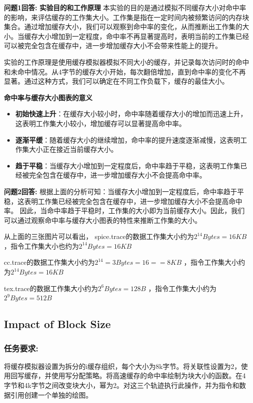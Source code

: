 \documentclass[12pt,hyperref,a4paper,UTF8]{ctexart}
\begin{document}
\textbf{问题1回答:}
\textbf{实验目的和工作原理}
本实验的目的是通过模拟不同缓存大小对命中率的影响，来评估缓存的工作集大小。工作集是指在一定时间内被频繁访问的内存块集合。通过增加缓存大小，我们可以观察到命中率的变化，从而推断出工作集的大小。当缓存大小增加到一定程度，命中率不再显著提高时，表明当前的工作集已经可以被完全包含在缓存中，进一步增加缓存大小不会带来性能上的提升。

实验的工作原理是使用缓存模拟器模拟不同大小的缓存，并记录每次访问时的命中和未命中情况。从4字节的缓存大小开始，每次翻倍增加，直到命中率的变化不再显著。通过这种方式，我们可以确定在不同工作负载下，缓存的最佳大小。

\textbf{命中率与缓存大小图表的意义}
\begin{itemize}
  \item \textbf{初始快速上升}：在缓存大小较小时，命中率随着缓存大小的增加而迅速上升，这表明工作集大小较小，增加缓存可以显著提高命中率。
  \item \textbf{逐渐平缓}：随着缓存大小的继续增加，命中率的提升速度逐渐减慢，这表明工作集大小正在接近当前缓存大小。
  \item \textbf{趋于平稳}：当缓存大小增加到一定程度后，命中率趋于平稳，这表明工作集已经被完全包含在缓存中，进一步增加缓存大小不会提高命中率。
\end{itemize}


\textbf{问题2回答:}
根据上面的分析可知：当缓存大小增加到一定程度后，命中率趋于平稳，这表明工作集已经被完全包含在缓存中，进一步增加缓存大小不会提高命中率。
因此，当命中率趋于平稳时，工作集的大小即为当前缓存大小。因此，我们可以通过观察命中率与缓存大小图表的特性来推断工作集的大小。

从上面的三张图片可以看出，
spice.trace的数据工作集大小约为$2^14 Bytes = 16KB$ ，指令工作集大小也约为$2^14 Bytes = 16KB$

cc.trace的数据工作集大小约为$2^14=3 Bytes = 16==8KB$ ，指令工作集大小约为$2^14 Bytes = 16KB$

tex.trace的数据工作集大小约为$2^6 Bytes = 128B$ ，指令工作集大小约为$2^9 Bytes = 512B$


\subsection*{Impact of Block Size}


\subsubsection*{任务要求:}
将缓存模拟器设置为拆分的i缓存组织，每个大小为8k字节。将关联性设置为2，使用回写缓存，并使用写分配策略。将高速缓存的命中率绘制为块大小的函数。在4字节和4k字节之间改变块大小，幂为2。对这三个轨迹执行此操作，并为指令和数据引用创建一个单独的绘图。
\end{document}
